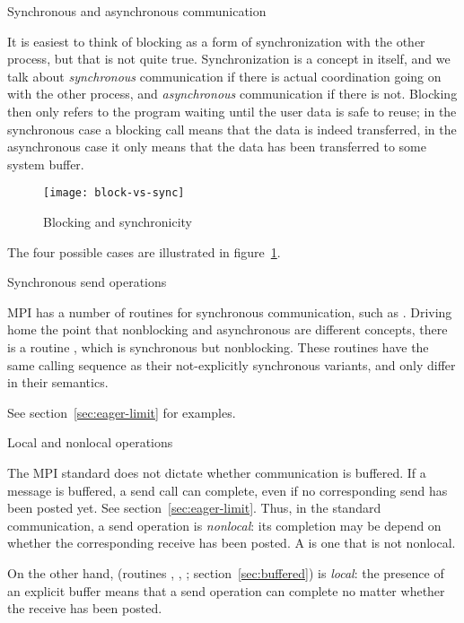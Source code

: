  {Synchronous and asynchronous communication}

It is easiest to think of blocking as a form of synchronization with
the other process, but that is not quite true. Synchronization is a
concept in itself, and we talk about \emph{synchronous} communication
if there is actual coordination going on with the other process,
and \emph{asynchronous} communication if there is not. Blocking then
only refers to the program waiting until the user data is safe
to reuse; in the synchronous case a blocking call means that the data
is indeed transferred, in the asynchronous case it only means that the
data has been transferred to some system buffer.
%
\begin{figure}[ht]
\texttt{[image: block-vs-sync]}
\caption{Blocking and synchronicity}
\label{fig:block-sync}
\end{figure}
The four possible cases are illustrated in figure~\ref{fig:block-sync}.

 {Synchronous send operations}
\label{sec:syncsend}

MPI has a number of routines for synchronous communication,
such as .
Driving home the point that nonblocking and asynchronous are
different concepts, there is a routine ,
which is synchronous but nonblocking.
These routines have the same calling sequence as their not-explicitly
synchronous variants, and only differ in their semantics.

See section~\ref{sec:eager-limit} for examples.


 {Local and nonlocal operations}
\label{sec:mpi-local-non}
\label{sec:local-non-send}

The MPI standard does not dictate whether communication is buffered.
If a message is buffered, a send call can complete,
even if no corresponding send has been posted yet.
See section~\ref{sec:eager-limit}.
Thus, in the standard communication, a send operation
is \emph{nonlocal}: its completion may be depend on
whether the corresponding receive has been posted.
A  is one that is not nonlocal.

On the other hand, 
(routines , ,
; section~\ref{sec:buffered})
is \emph{local}:
the presence of an explicit buffer means that a send operation
can complete no matter whether the receive has been posted.

